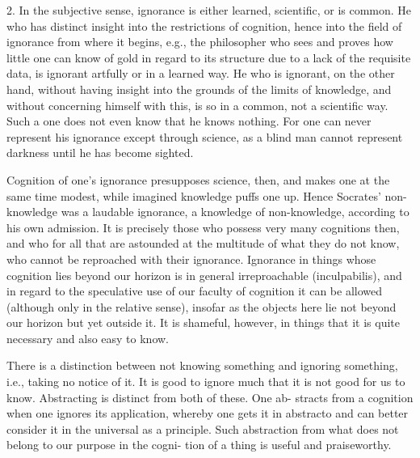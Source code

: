     2. In the subjective sense, ignorance is either learned, scientific, or is common.
    He who has distinct insight into the restrictions of cognition,
    hence into the field of ignorance from where it begins,
    e.g., the philosopher who sees and proves how little one can know of
    gold in regard to its structure due to a lack of the requisite data,
    is ignorant artfully or in a learned way.
    He who is ignorant, on the other hand, without
    having insight into the grounds of the limits of knowledge,
    and without concerning himself with this, is so in a common, not a scientific way.
    Such a one does not even know that he knows nothing.
    For one can never represent his ignorance except through science,
    as a blind man cannot represent darkness until he has become sighted.

    Cognition of one's ignorance presupposes science, then, and
    makes one at the same time modest, while imagined knowledge puffs one up.
    Hence Socrates' non-knowledge was a laudable ignorance,
    a knowledge of non-knowledge, according to his own admission.
    It is precisely those who possess very many cognitions then, and
    who for all that are astounded at the multitude of what they do not know,
    who cannot be reproached with their ignorance.
    Ignorance in things whose cognition lies beyond our horizon is in
    general irreproachable (inculpabilis), and in regard to the speculative use of
    our faculty of cognition it can be allowed (although only in the relative
    sense), insofar as the objects here lie not beyond our horizon but yet outside
    it. It is shameful, however, in things that it is quite necessary and also easy
    to know.

    There is a distinction between not knowing something and ignoring
    something, i.e., taking no notice of it. It is good to ignore much that it is not
    good for us to know. Abstracting is distinct from both of these. One ab-
    stracts from a cognition when one ignores its application, whereby one
    gets it in abstracto and can better consider it in the universal as a principle.
    Such abstraction from what does not belong to our purpose in the cogni-
    tion of a thing is useful and praiseworthy.

